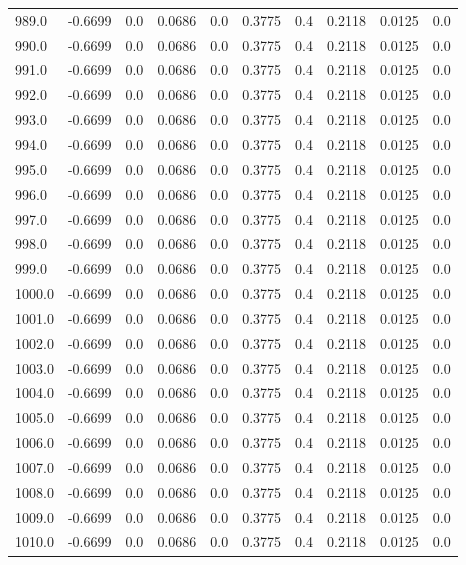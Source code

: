\begin{longtable}{lrrrrrrrrr}
989.0 & -0.6699 & 0.0 & 0.0686 & 0.0 & 0.3775 & 0.4 & 0.2118 & 0.0125 & 0.0 \\
990.0 & -0.6699 & 0.0 & 0.0686 & 0.0 & 0.3775 & 0.4 & 0.2118 & 0.0125 & 0.0 \\
991.0 & -0.6699 & 0.0 & 0.0686 & 0.0 & 0.3775 & 0.4 & 0.2118 & 0.0125 & 0.0 \\
992.0 & -0.6699 & 0.0 & 0.0686 & 0.0 & 0.3775 & 0.4 & 0.2118 & 0.0125 & 0.0 \\
993.0 & -0.6699 & 0.0 & 0.0686 & 0.0 & 0.3775 & 0.4 & 0.2118 & 0.0125 & 0.0 \\
994.0 & -0.6699 & 0.0 & 0.0686 & 0.0 & 0.3775 & 0.4 & 0.2118 & 0.0125 & 0.0 \\
995.0 & -0.6699 & 0.0 & 0.0686 & 0.0 & 0.3775 & 0.4 & 0.2118 & 0.0125 & 0.0 \\
996.0 & -0.6699 & 0.0 & 0.0686 & 0.0 & 0.3775 & 0.4 & 0.2118 & 0.0125 & 0.0 \\
997.0 & -0.6699 & 0.0 & 0.0686 & 0.0 & 0.3775 & 0.4 & 0.2118 & 0.0125 & 0.0 \\
998.0 & -0.6699 & 0.0 & 0.0686 & 0.0 & 0.3775 & 0.4 & 0.2118 & 0.0125 & 0.0 \\
999.0 & -0.6699 & 0.0 & 0.0686 & 0.0 & 0.3775 & 0.4 & 0.2118 & 0.0125 & 0.0 \\
1000.0 & -0.6699 & 0.0 & 0.0686 & 0.0 & 0.3775 & 0.4 & 0.2118 & 0.0125 & 0.0 \\
1001.0 & -0.6699 & 0.0 & 0.0686 & 0.0 & 0.3775 & 0.4 & 0.2118 & 0.0125 & 0.0 \\
1002.0 & -0.6699 & 0.0 & 0.0686 & 0.0 & 0.3775 & 0.4 & 0.2118 & 0.0125 & 0.0 \\
1003.0 & -0.6699 & 0.0 & 0.0686 & 0.0 & 0.3775 & 0.4 & 0.2118 & 0.0125 & 0.0 \\
1004.0 & -0.6699 & 0.0 & 0.0686 & 0.0 & 0.3775 & 0.4 & 0.2118 & 0.0125 & 0.0 \\
1005.0 & -0.6699 & 0.0 & 0.0686 & 0.0 & 0.3775 & 0.4 & 0.2118 & 0.0125 & 0.0 \\
1006.0 & -0.6699 & 0.0 & 0.0686 & 0.0 & 0.3775 & 0.4 & 0.2118 & 0.0125 & 0.0 \\
1007.0 & -0.6699 & 0.0 & 0.0686 & 0.0 & 0.3775 & 0.4 & 0.2118 & 0.0125 & 0.0 \\
1008.0 & -0.6699 & 0.0 & 0.0686 & 0.0 & 0.3775 & 0.4 & 0.2118 & 0.0125 & 0.0 \\
1009.0 & -0.6699 & 0.0 & 0.0686 & 0.0 & 0.3775 & 0.4 & 0.2118 & 0.0125 & 0.0 \\
1010.0 & -0.6699 & 0.0 & 0.0686 & 0.0 & 0.3775 & 0.4 & 0.2118 & 0.0125 & 0.0 \\

\end{longtable}
